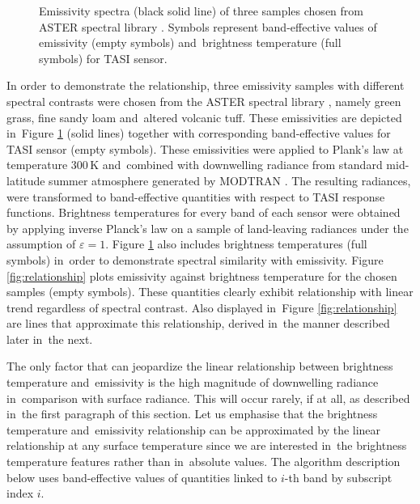 \begin{figure}[!t]
\begin{subfigure}[t]{.3\linewidth}
		\caption{}
	\end{subfigure}
	\vspace{1.5 em}
	\caption{Emissivity spectra (black solid line) of three samples chosen from ASTER spectral library \cite{BH09}. Symbols represent band-effective values of emissivity (empty symbols) and~brightness temperature (full symbols) for TASI sensor. }
	\label{fig:emissivitySpectra_spectra}
\end{figure}

In order to demonstrate the relationship, three emissivity samples with different spectral contrasts were chosen from the ASTER spectral library \cite{BH09}, namely green grass, fine sandy loam and~altered volcanic tuff. These emissivities are depicted in~Figure \ref{fig:emissivitySpectra_spectra} (solid lines) together with corresponding band-effective values for TASI sensor (empty symbols). These emissivities were applied to Plank's law at temperature $300\,\mathrm{K}$ and~combined with downwelling radiance from standard mid-latitude summer atmosphere generated by MODTRAN \cite{BG06}. The resulting radiances, were transformed to band-effective quantities with respect to TASI response functions. Brightness temperatures for every band of each sensor were obtained by applying inverse Planck's law on a sample of land-leaving radiances under the assumption of $\varepsilon=1$. Figure \ref{fig:emissivitySpectra_spectra} also includes brightness temperatures (full symbols) in~order to demonstrate spectral similarity with emissivity. Figure \ref{fig:relationship} plots emissivity against brightness temperature for the chosen samples (empty symbols). These quantities clearly exhibit relationship with linear trend regardless of spectral contrast. Also displayed in~Figure \ref{fig:relationship} are lines that approximate this relationship, derived in~the manner described later in~the next. 

The only factor that can jeopardize the linear relationship between brightness temperature and~emissivity is the high magnitude of downwelling radiance in~comparison with surface radiance. This will occur rarely, if at all, as described in~the first paragraph of this section. Let us emphasise that the brightness temperature and~emissivity relationship can be approximated by the linear relationship at any surface temperature since we are interested in~the brightness temperature features rather than in~absolute values. The algorithm description below uses band-effective values of quantities linked to $i$-th band by subscript index $i$. 

